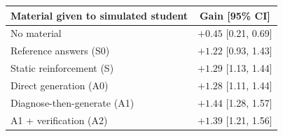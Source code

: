 \begin{tabular}{lc}
\toprule
Material given to simulated student & Gain [95\% CI] \\
\midrule
No material & $+0.45$ [0.21, 0.69] \\
Reference answers (S0) & $+1.22$ [0.93, 1.43] \\
Static reinforcement (S) & $+1.29$ [1.13, 1.44] \\
Direct generation (A0) & $+1.28$ [1.11, 1.44] \\
Diagnose-then-generate (A1) & $+1.44$ [1.28, 1.57] \\
A1 + verification (A2) & $+1.39$ [1.21, 1.56] \\
\bottomrule
\end{tabular}